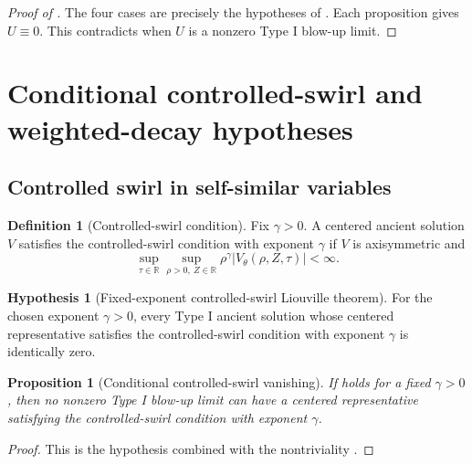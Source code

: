 \documentclass[11pt]{amsart}
\theoremstyle{plain}
\newtheorem{proposition}[theorem]{Proposition}
\theoremstyle{definition}
\newtheorem{definition}[theorem]{Definition}
\newtheorem{hypothesis}[theorem]{Hypothesis}
\theoremstyle{remark}
\numberwithin{equation}{section}
\begin{document}
\begin{proof}[Proof of ]
The four cases are precisely the hypotheses of
.
Each proposition gives \(U\equiv0\).  This contradicts
 when \(U\) is a nonzero Type I blow-up limit.
\end{proof}

\section{Conditional controlled-swirl and weighted-decay hypotheses}
\label{sec:conditional}

\subsection{Controlled swirl in self-similar variables}

\begin{definition}[Controlled-swirl condition]
\label{def:controlled-swirl}
Fix \(\gamma>0\).  A centered ancient solution \(V\) satisfies the
controlled-swirl condition with exponent \(\gamma\) if \(V\) is axisymmetric
and
\[
   \sup_{\tau\in\mathbb R}\sup_{\rho>0,\ Z\in\mathbb R}
   \rho^\gamma |V_\theta(\rho,Z,\tau)|<\infty .
\]
\end{definition}

\begin{hypothesis}[Fixed-exponent controlled-swirl Liouville theorem]
\label{hyp:controlled-swirl-liouville}
For the chosen exponent \(\gamma>0\), every Type I ancient solution whose
centered representative satisfies the controlled-swirl condition with exponent
\(\gamma\) is identically zero.
\end{hypothesis}

\begin{proposition}[Conditional controlled-swirl vanishing]
\label{prop:controlled-swirl-conditional}
If  holds for a fixed \(\gamma>0\), then
no nonzero Type I blow-up limit can have a centered representative
satisfying the controlled-swirl condition with exponent \(\gamma\).
\end{proposition}

\begin{proof}
This is the hypothesis combined with the nontriviality
.
\end{proof}
\end{document}
